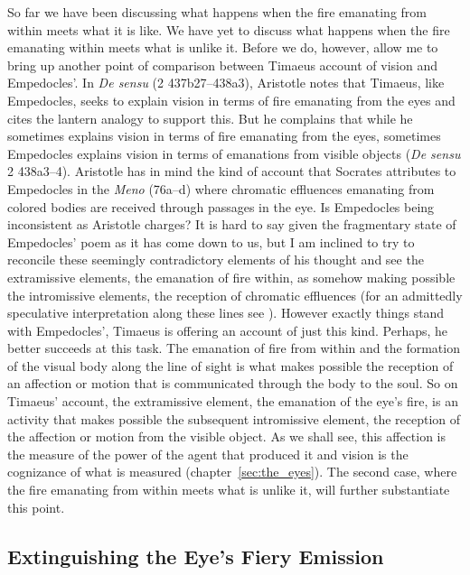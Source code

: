 So far we have been discussing what happens when the fire emanating from within meets what it is like. We have yet to discuss what happens when the fire emanating within meets what is unlike it. Before we do, however, allow me to bring up another point of comparison between Timaeus account of vision and Empedocles'. In \emph{De sensu} (2 437b27--438a3), Aristotle notes that Timaeus, like Empedocles, seeks to explain vision in terms of fire emanating from the eyes and cites the lantern analogy to support this. But he complains that while he sometimes explains vision in terms of fire emanating from the eyes, sometimes Empedocles explains vision in terms of emanations from visible objects (\emph{De sensu} 2 438a3--4). Aristotle has in mind the kind of account that Socrates attributes to Empedocles in the \emph{Meno} (76a--d) where chromatic effluences emanating from colored bodies are received through passages in the eye. Is Empedocles being inconsistent as Aristotle charges? It is hard to say given the fragmentary state of Empedocles' poem as it has come down to us, but I am inclined to try to reconcile these seemingly contradictory elements of his thought and see the extramissive elements, the emanation of fire within, as somehow making possible the intromissive elements, the reception of chromatic effluences (for an admittedly speculative interpretation along these lines see \citealt[chapter 1.3]{Kalderon:2015fr}). However exactly things stand with Empedocles', Timaeus is offering an account of just this kind. Perhaps, he better succeeds at this task. The emanation of fire from within and the formation of the visual body along the line of sight is what makes possible the reception of an affection or motion that is communicated through the body to the soul. So on Timaeus' account, the extramissive element, the emanation of the eye's fire, is an activity that makes possible the subsequent intromissive element, the reception of the affection or motion from the visible object. As we shall see, this affection is the measure of the power of the agent that produced it and vision is the cognizance of what is measured (chapter~\ref{sec:the_eyes}). The second case, where the fire emanating from within meets what is unlike it, will further substantiate this point.


\subsection{Extinguishing the Eye's Fiery Emission} %
\label{sub:the_quenching_of_the_eye_s_fire}

